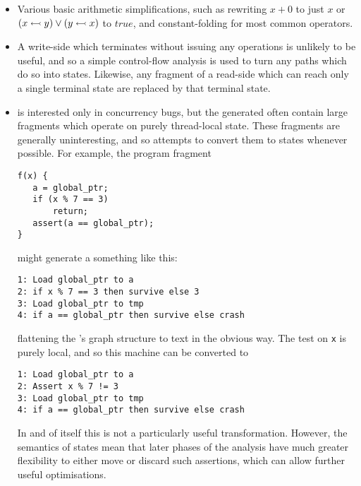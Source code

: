 \begin{itemize}
\item
  Various basic arithmetic simplifications, such as rewriting $x + 0$
  to just $x$ or $(x \leftarrowtail y) \vee (y \leftarrowtail x)$ to
  $true$, and constant-folding for most common operators.
\item
  A write-side {\StateMachine} which terminates without issuing any
   operations is unlikely to be useful, and so a simple
  control-flow analysis is used to turn any paths which do so into
   states.  Likewise, any fragment of a read-side
  {\StateMachine} which can reach only a single terminal state
  are replaced by that terminal state.
\item
  {\Technique} is interested only in concurrency bugs, but the
  {\StateMachines} generated often contain large fragments which
  operate on purely thread-local state.  These fragments are generally
  uninteresting, and so {\technique} attempts to convert them to
   states whenever possible.  For example, the program
  fragment

\begin{verbatim}
f(x) {
   a = global_ptr;
   if (x % 7 == 3)
       return;
   assert(a == global_ptr);
}
\end{verbatim}

   might generate a {\StateMachine} something like this:

\begin{verbatim}
1: Load global_ptr to a
2: if x % 7 == 3 then survive else 3
3: Load global_ptr to tmp
4: if a == global_ptr then survive else crash
\end{verbatim}

   flattening the {\StateMachine}'s graph structure to text in the
   obvious way.  The test on \verb|x| is purely local, and so this
   machine can be converted to

\begin{verbatim}
1: Load global_ptr to a
2: Assert x % 7 != 3
3: Load global_ptr to tmp
4: if a == global_ptr then survive else crash
\end{verbatim}

   In and of itself this is not a particularly useful transformation.
   However, the semantics of  states mean that later
   phases of the analysis have much greater flexibility to either move
   or discard such assertions, which can allow further useful
   optimisations.  
\end{itemize}

